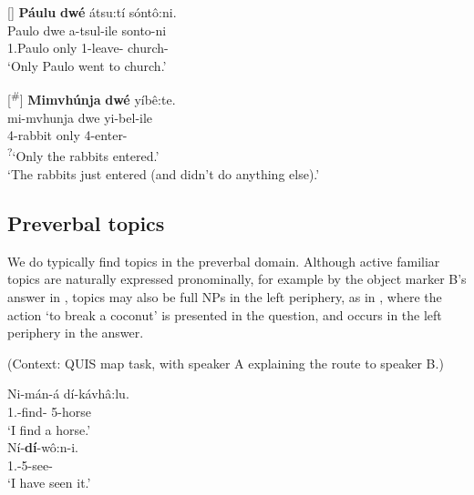 \documentclass[output=paper]{langscibook}
\begin{document}
\z

\ea
[]{
\textbf{Páulu} \textbf{dwé} átsu:tí sóntô:ni.\\
\gll
Paulo  dwe  a-tsul-ile  sonto-ni\\
1.Paulo  only  1\SM{}-leave-\PFV{}  church-\LOC{}\\
\glt
‘Only Paulo went to church.’\\
}

\z

\ea
[\textsuperscript{\#}]{
\label{bkm:Ref124149613}\label{bkm:Ref141347020}
\textbf{Mimvhúnja} \textbf{dwé} yíbê:te.\\
\gll
mi-mvhunja  dwe  yi-bel-ile\\
4-rabbit  only  4\SM{}-enter-\PFV{}\\
\glt
\textsuperscript{?}`Only the rabbits entered.’\\
‘The rabbits just entered (and didn’t do anything else).’
}

\z

\subsection{Preverbal topics}
\label{bkm:Ref124153637}
We do typically find topics in the preverbal domain. Although active familiar topics are naturally expressed pronominally, for example by the object marker B's answer in , topics may also be full NPs in the left periphery, as in , where the action ‘to break a coconut’ is presented in the question, and occurs in the left periphery in the answer.

\ea
(Context: QUIS map task, with speaker A explaining the route to speaker B.)\\
\begin{xlist}

\gll
Ni-mán-á  dí-kávhâ:lu.\\
1\SG.\SM{}-find-\FV{}  5-horse\\
\glt
‘I find a horse.’\\

\label{bkm:Ref120091592}
\gll
Ní-\textbf{dí}{}-wô:n-i.\\
1\SG.\SM{}-5\OM{}-see-\PFV{}\\
\glt
‘I have seen it.’

\end{xlist}
\z
\end{document}
